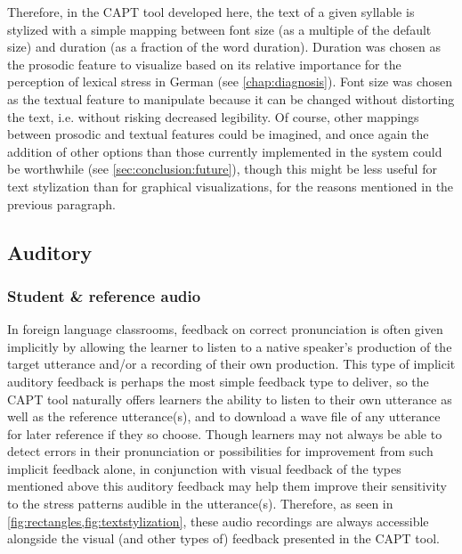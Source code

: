 		
		Therefore, in the CAPT tool developed here, the text of a given syllable is stylized with a simple mapping between font size (as a multiple of the default size) and duration (as a fraction of the word duration). Duration was chosen as the prosodic feature to visualize based on its relative importance for the perception of lexical stress in German (see \cref{chap:diagnosis}). Font size was chosen as the textual feature to manipulate because it can be changed without distorting the text, i.e. without risking decreased legibility. Of course, other mappings between prosodic and textual features could be imagined, and once again the addition of other options than those currently implemented in the system could be worthwhile (see \cref{sec:conclusion:future}), though this might be less useful for text stylization than for  graphical visualizations, for the reasons mentioned in the previous paragraph.
		
			
			
		\subsection{Auditory}
		\label{sec:implicit:auditory}		
		
			\subsubsection{Student \& reference audio}
			\label{sec:implicit:auditory:basic}
			In foreign language classrooms, feedback on correct pronunciation is often given implicitly by
allowing the learner to listen to a native speaker's production of the target utterance and/or a recording of their own production. This type of implicit auditory feedback is perhaps the most simple feedback type to deliver, so the CAPT tool naturally offers learners the ability to listen to their own utterance as well as the reference utterance(s), and to download a wave file of any utterance for later reference if they so choose. Though learners may not always be able to detect errors in their pronunciation or possibilities for improvement from such implicit feedback alone, in conjunction with visual feedback of the types mentioned above this auditory feedback may help them improve their sensitivity to the stress patterns audible in the utterance(s). Therefore, as seen in \cref{fig:rectangles,fig:textstylization}, these audio recordings are always accessible alongside the visual (and other types of) feedback presented in the CAPT tool.
			
